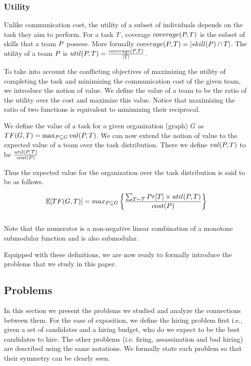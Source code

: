 \subsubsection{Utility}
Unlike communication cost, the utility of a subset of individuals depends on the task they aim to perform. 
For a task $T$, coverage $coverage(P,T)$ is the subset of skills that a team $P$ possess.
More formally $coverage(P,T) = |skill(P) \cap T|$.
The utility of a team $ P $ is ${util}(P,T) = \frac{coverage(P, T)}{|T|}$.

To take into account the conflicting objectives of maximizing the utility of completing the task and minimizing the communication cost of the given team, we introduce the notion of value. We define the value of a team to be the ratio of the utility over the cost and maximize this value. Notice that maximizing the ratio of two functions is equivalent to minimizing their reciprocal.  

We define the value of a task for a given organization (graph) $G$ as $TF(G,T) = \max_{P \subseteq G}{val(P,T)}$. We can now extend the notion of value to the expected value of a team over the task distribution. There we define $val(P,T)$ to be $\frac{{util}(P,\mathcal{T})}{cost(P)} $

Thus the expected value for the organization over the task distribution is said to be as follows.

$$\mathbb{E}[TF(G,T)] = max_{P \subseteq G} \left\{ \frac{\sum_{T \sim \mathcal{T} } Pr[T] \times {util}(P, T)} {cost(P)} \right\} $$ \\

Note that the numerator is a non-negative linear combination of a monotone submodular function and is also submodular.

Equipped with these definitions, we are now ready to formally introduce the problems that we study in this paper.

\subsection{Problems}

In this section we present the problems we studied and analyze the connections between them. For the ease of exposition, we define the hiring problem first i.e., given a set of candidates and a hiring budget, who do we expect to be the best candidates to hire. The other problems (i.e. firing, assassination and bad hiring) are described using the same notations. We formally state each problem so that their symmetry can be clearly seen.

